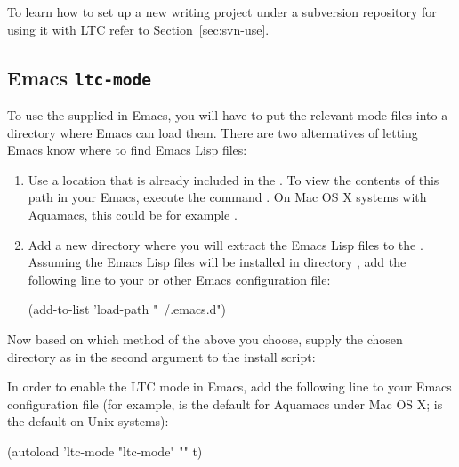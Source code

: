 To learn how to set up a new writing project under a subversion repository for using it with LTC refer to Section~\ref{sec:svn-use}.


\subsection{Emacs \texttt{ltc-mode}} \label{sec:config-emacs}

To use the supplied  in Emacs, you will have to put the relevant mode files into a directory where Emacs can load them. There are two alternatives of letting Emacs know where to find Emacs Lisp files:
\begin{enumerate}
\item Use a location that is already included in the . To view the contents of this path in your Emacs, execute the command .  On Mac OS X systems with Aquamacs, this could be for example .
\item Add a new directory where you will extract the Emacs Lisp files to the . Assuming the Emacs Lisp files will be installed in directory , add the following line to your  or other Emacs configuration file:
  \begin{FileVerbatim}
(add-to-list 'load-path "~/.emacs.d")
  \end{FileVerbatim}
\end{enumerate}

Now based on which method of the above you choose, supply the chosen directory as  in the second argument to the install script:

In order to enable the LTC mode in Emacs, add the following line to your Emacs configuration file (for example,  is the default for Aquamacs under Mac OS X;  is the default on Unix systems):
\begin{FileVerbatim}
(autoload 'ltc-mode "ltc-mode" "" t)
\end{FileVerbatim}

